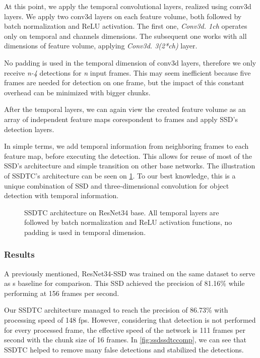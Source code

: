At this point, we apply the temporal convolutional layers, realized using conv3d layers. We apply two conv3d layers on each feature volume, both followed by batch normalization and ReLU activation.  The first one, \textit{Conv3d. 1\x ch} operates only on temporal and channels dimensions.  The subsequent one works with all dimensions of feature volume, applying \textit{Conv3d. 3\x(2*ch)} layer. 

No padding is used in the temporal dimension of conv3d layers, therefore we only receive \textit{n-4} detections for \textit{n} input frames. This may seem inefficient because five frames are needed for detection on one frame, but the impact of this constant overhead can be minimized with bigger chunks. 

After the temporal layers, we can again view the created feature volume as an array of independent feature maps corespondent to frames and apply SSD's detection layers. 

In simple terms, we add temporal information from neighboring frames to each feature map, before executing the detection. This allows for reuse of most of the SSD's architecture and simple transition on other base networks. The illustration of SSDTC's architecture can be seen on \cref{fig:ssdtc}. To our best knowledge, this is a unique combination of SSD and three-dimensional convolution for object detection with temporal information.

\begin{figure}
    \centering
    \ssdtc
    \caption[Single Shot Detector with Temporal Convolution (SSDTC)]{SSDTC architecture on ResNet34 base. All temporal layers are followed by batch normalization and ReLU activation functions, no padding is used in temporal dimension.}
    \label{fig:ssdtc}
\end{figure}


\subsubsection{Results}
A previously mentioned, ResNet34-SSD was trained on the same dataset to serve as s baseline for comparison. This SSD achieved the precision of 81.16\% while performing at 156 frames per second. 

Our SSDTC architecture managed to reach the precision of 86.73\% with processing speed of 148 fps. However, considering that detection is not performed for every processed frame, the effective speed of the network is 111 frames per second with the chunk size of 16 frames. In \cref{fig:ssdssdtccomp}, we can see that SSDTC helped to remove many false detections and stabilized the detections.

